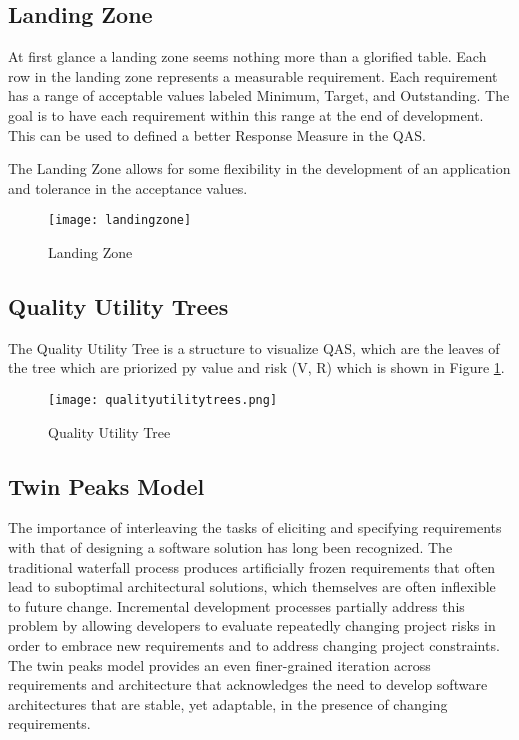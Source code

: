\subsection{Landing Zone}
At first glance a landing zone seems nothing more than a glorified table. Each row in the landing zone represents a measurable requirement. Each requirement has a range of acceptable values labeled Minimum, Target, and Outstanding. The goal is to have each requirement within this range at the end of development. This can be used to defined a better Response Measure in the QAS.

The Landing Zone allows for some flexibility in the development of an application and tolerance in the acceptance values.

\begin{figure}[H]
  \center
  \texttt{[image: landingzone]}
  \caption{Landing Zone}
\end{figure}

\subsection{Quality Utility Trees}
The Quality Utility Tree is a structure to visualize QAS, which are the leaves of the tree which are priorized py value and risk (V, R) which is shown in Figure \ref{fig:qualityutilitytree}.

\begin{figure}[H]
  \center
  \texttt{[image: qualityutilitytrees.png]}
  \caption{Quality Utility Tree}
  \label{fig:qualityutilitytree}
\end{figure}

\subsection{Twin Peaks Model}
The importance of interleaving the tasks of eliciting and specifying requirements with that of designing a software solution has long been recognized. The traditional waterfall process produces artificially frozen requirements that often lead to suboptimal architectural solutions, which themselves are often inflexible to future change. Incremental development processes partially address this problem by allowing developers to evaluate repeatedly changing project risks in order to embrace new requirements and to address changing project constraints. The twin peaks model provides an even finer-grained iteration across requirements and architecture that acknowledges the need to develop software architectures that are stable, yet adaptable, in the presence of changing requirements.

